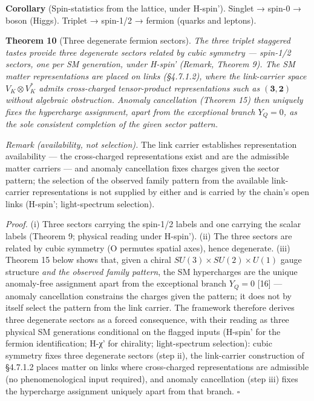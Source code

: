 \documentclass[
]{article}
\begin{document}
\textbf{Corollary} (Spin-statistics from the lattice, under H-spin').
Singlet → spin-0 → boson (Higgs). Triplet → spin-1/2 → fermion (quarks
and leptons).

\textbf{Theorem 10} (Three degenerate fermion sectors). \emph{The three
triplet staggered tastes provide three degenerate sectors related by
cubic symmetry --- spin-1/2 sectors, one per SM generation, under
H-spin' (Remark, Theorem 9). The SM matter representations are placed on
links (§4.7.1.2), where the link-carrier space \(V_K \otimes V_K^*\)
admits cross-charged tensor-product representations such as
\((\mathbf{3}, \mathbf{2})\) without algebraic obstruction. Anomaly
cancellation (Theorem 15) then uniquely fixes the hypercharge
assignment, apart from the exceptional branch \(Y_Q=0\), as the sole
consistent completion of the given sector pattern.}

\emph{Remark (availability, not selection).} The link carrier
establishes representation availability --- the cross-charged
representations exist and are the admissible matter carriers --- and
anomaly cancellation fixes charges given the sector pattern; the
selection of the observed family pattern from the available link-carrier
representations is not supplied by either and is carried by the chain's
open links (H-spin'; light-spectrum selection).

\emph{Proof.} (i) Three sectors carrying the spin-1/2 labels and one
carrying the scalar labels (Theorem 9; physical reading under H-spin').
(ii) The three sectors are related by cubic symmetry (O permutes spatial
axes), hence degenerate. (iii) Theorem 15 below shows that, given a
chiral \(SU(3) \times SU(2) \times U(1)\) gauge structure \emph{and the
observed family pattern}, the SM hypercharges are the unique
anomaly-free assignment apart from the exceptional branch \(Y_Q=0\)
{[}16{]} --- anomaly cancellation constrains the charges given the
pattern; it does not by itself select the pattern from the link carrier.
The framework therefore derives three degenerate sectors as a forced
consequence, with their reading as three physical SM generations
conditional on the flagged inputs (H-spin' for the fermion
identification; H-χ' for chirality; light-spectrum selection): cubic
symmetry fixes three degenerate sectors (step ii), the link-carrier
construction of §4.7.1.2 places matter on links where cross-charged
representations are admissible (no phenomenological input required), and
anomaly cancellation (step iii) fixes the hypercharge assignment
uniquely apart from that branch. \(\square\)
\end{document}
